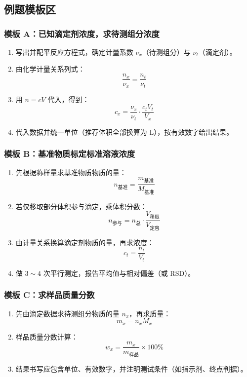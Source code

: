 \documentclass[12pt,a4paper]{article}
\numberwithin{equation}{section}
\newenvironment{exampletemplate}[1]{
\subsubsection*{#1}
\begin{enumerate}
}{
\end{enumerate}
}
\begin{document}
\subsection{例题模板区}

\begin{exampletemplate}{模板 A：已知滴定剂浓度，求待测组分浓度}
    \item 写出并配平反应方程式，确定计量系数 $\nu_x$（待测组分）与 $\nu_t$（滴定剂）。
    \item 由化学计量关系列式：
\begin{equation}
    \frac{n_x}{\nu_x}=\frac{n_t}{\nu_t}
\end{equation}
    \item 用 $n=cV$ 代入，得到：
\begin{equation}
    c_x=\frac{\nu_x}{\nu_t}\cdot\frac{c_tV_t}{V_x}
\end{equation}
    \item 代入数据并统一单位（推荐体积全部换算为 L），按有效数字给出结果。
\end{exampletemplate}

\begin{exampletemplate}{模板 B：基准物质标定标准溶液浓度}
    \item 先根据称样量求基准物质物质的量：
\begin{equation}
    n_{\text{基准}}=\frac{m_{\text{基准}}}{M_{\text{基准}}}
\end{equation}
    \item 若仅移取部分体积参与滴定，乘体积分数：
\begin{equation}
    n_{\text{参与}}=n_{\text{总}}\cdot\frac{V_{\text{移取}}}{V_{\text{定容}}}
\end{equation}
    \item 由计量关系换算滴定剂物质的量，再求浓度：
\begin{equation}
    c_t=\frac{n_t}{V_t}
\end{equation}
    \item 做 $3\sim4$ 次平行测定，报告平均值与相对偏差（或 RSD）。
\end{exampletemplate}

\begin{exampletemplate}{模板 C：求样品质量分数}
    \item 先由滴定数据求待测组分物质的量 $n_x$，再求质量：
\begin{equation}
    m_x=n_xM_x
\end{equation}
    \item 样品质量分数计算：
\begin{equation}
    w_x=\frac{m_x}{m_{\text{样品}}}\times 100\%
\end{equation}
    \item 结果书写应包含单位、有效数字，并注明测试条件（如指示剂、终点判据）。
\end{exampletemplate}
\end{document}
